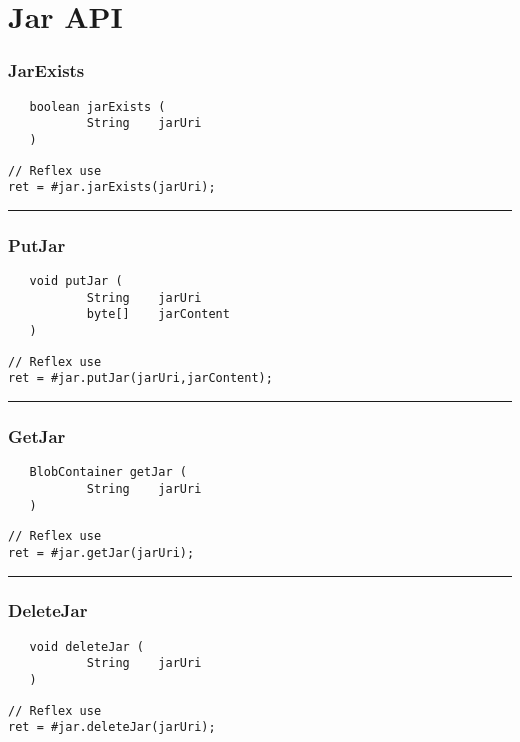 \section{Jar API}

\subsubsection{JarExists}
\label{Api:JarExists}
\begin{verbatim}
   boolean jarExists (
           String    jarUri
   )
\end{verbatim}
\begin{lstlisting}[language=reflex]
// Reflex use
ret = #jar.jarExists(jarUri);
\end{lstlisting}



\rule{15cm}{2pt}
\subsubsection{PutJar}
\label{Api:PutJar}
\begin{verbatim}
   void putJar (
           String    jarUri
           byte[]    jarContent
   )
\end{verbatim}
\begin{lstlisting}[language=reflex]
// Reflex use
ret = #jar.putJar(jarUri,jarContent);
\end{lstlisting}



\rule{15cm}{2pt}
\subsubsection{GetJar}
\label{Api:GetJar}
\begin{verbatim}
   BlobContainer getJar (
           String    jarUri
   )
\end{verbatim}
\begin{lstlisting}[language=reflex]
// Reflex use
ret = #jar.getJar(jarUri);
\end{lstlisting}



\rule{15cm}{2pt}
\subsubsection{DeleteJar}
\label{Api:DeleteJar}
\begin{verbatim}
   void deleteJar (
           String    jarUri
   )
\end{verbatim}
\begin{lstlisting}[language=reflex]
// Reflex use
ret = #jar.deleteJar(jarUri);
\end{lstlisting}



